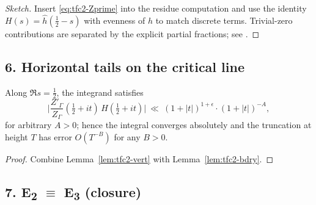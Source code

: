 \begin{proof}[Sketch]\relax\hspace{0pt}
Insert \eqref{eq:tfc2-Zprime} into the residue computation and use the identity $H(s)=\widehat{h}(\tfrac12-s)$ with evenness of $h$ to match discrete terms. Trivial-zero contributions are separated by the explicit partial fractions; see \cite[Ch.~6--7]{HejhalII}.\relax\hspace{0pt}
\end{proof}

\subsection*{6. Horizontal tails on the critical line}\relax\hspace{0pt}
\label{subsec:tfc2-criticaltails} %

\begin{proposition}[Tail decay on $\Re s=\tfrac12$]\relax\hspace{0pt}
\label{prop:tfc2-crit-tail} %
Along $\Re s=\tfrac12$, the integrand satisfies
\[
\Big|\frac{Z'_\Gamma}{Z_\Gamma}(\tfrac12+it)\,H(\tfrac12+it)\Big|\ \ll\ (1+|t|)^{1+\epsilon}\cdot (1+|t|)^{-A},
\]
for arbitrary $A>0$; hence the integral converges absolutely and the truncation at height $T$ has error $O(T^{-B})$ for any $B>0$.\relax\hspace{0pt}
\end{proposition}

\begin{proof}\relax\hspace{0pt}
Combine Lemma~\ref{lem:tfc2-vert} with Lemma~\ref{lem:tfc2-bdry}.\relax\hspace{0pt}
\end{proof}

\subsection*{7. E\textsubscript{2} $\equiv$ E\textsubscript{3} (closure)}\relax\hspace{0pt}
\label{subsec:tfc2-closure} %

